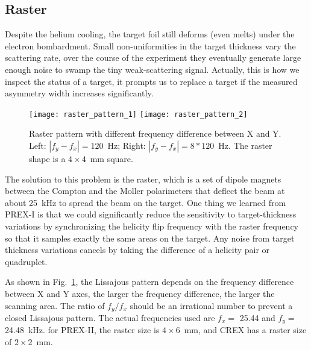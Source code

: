 \subsection{Raster}
Despite the helium cooling, the target foil still deforms (even melts)
under the electron bombardment. Small non-uniformities in the target 
thickness vary the scattering rate, over the course of the experiment they 
eventually generate large enough noise to swamp the tiny weak-scattering signal.
Actually, this is how we inspect the status of a target, it prompts us to
replace a target if the measured asymmetry width increases significantly.

\begin{figure}[!h]
    \centering
    \texttt{[image: raster\_pattern\_1]}
    \texttt{[image: raster\_pattern\_2]}
    \caption{Raster pattern with different frequency difference between X and Y.
    Left: $|f_y - f_x| = 120$~Hz; Right: $|f_y - f_x| = 8*120$~Hz. The raster
    shape is a $4\times 4$~mm square.} 
    \label{fig:raster_pattern}
\end{figure}

The solution to this problem is the raster, which is a set of dipole magnets %
between the Compton and the Moller polarimeters
that deflect the beam at about 25~kHz to spread the beam on the target.
One thing we learned from PREX-I is that we could significantly reduce the sensitivity 
to target-thickness variations by synchronizing the helicity flip frequency
with the raster frequency so that it samples exactly the same areas on the target.
Any noise from target thickness variations cancels by taking the difference of
a helicity pair or quadruplet. 

As shown in Fig.~\ref{fig:raster_pattern}, the Lissajous pattern depends
on the frequency difference between X and Y axes, the larger the frequency difference,
the larger the scanning area. The ratio of $f_y/f_x$ should be an irrational number
to prevent a closed Lissajous pattern. The actual frequencies used are $f_x =$ 25.44
and $f_y =$ 24.48~kHz. for PREX-II, the raster size is $4 \times 6$~mm, and CREX
has a raster size of $2 \times 2$~mm.


